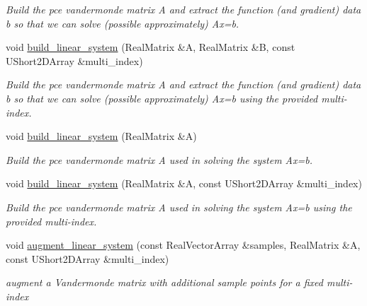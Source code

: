 \begin{DoxyCompactItemize}
\begin{DoxyCompactList}\small\item\em Build the pce vandermonde matrix A and extract the function (and gradient) data b so that we can solve (possible approximately) Ax=b. \end{DoxyCompactList}\item 
void \hyperlink{classPecos_1_1RegressOrthogPolyApproximation_a28018036bd652f9eaa722ab919317a23}{build\+\_\+linear\+\_\+system} (Real\+Matrix \&A, Real\+Matrix \&B, const U\+Short2\+D\+Array \&multi\+\_\+index)\label{classPecos_1_1RegressOrthogPolyApproximation_a28018036bd652f9eaa722ab919317a23}

\begin{DoxyCompactList}\small\item\em Build the pce vandermonde matrix A and extract the function (and gradient) data b so that we can solve (possible approximately) Ax=b using the provided multi-\/index. \end{DoxyCompactList}\item 
void \hyperlink{classPecos_1_1RegressOrthogPolyApproximation_a620d894eef826b544a8ddb15e10c3e19}{build\+\_\+linear\+\_\+system} (Real\+Matrix \&A)\label{classPecos_1_1RegressOrthogPolyApproximation_a620d894eef826b544a8ddb15e10c3e19}

\begin{DoxyCompactList}\small\item\em Build the pce vandermonde matrix A used in solving the system Ax=b. \end{DoxyCompactList}\item 
void \hyperlink{classPecos_1_1RegressOrthogPolyApproximation_a3596c36aef41fa9dfe102f9324bedc0e}{build\+\_\+linear\+\_\+system} (Real\+Matrix \&A, const U\+Short2\+D\+Array \&multi\+\_\+index)\label{classPecos_1_1RegressOrthogPolyApproximation_a3596c36aef41fa9dfe102f9324bedc0e}

\begin{DoxyCompactList}\small\item\em Build the pce vandermonde matrix A used in solving the system Ax=b using the provided multi-\/index. \end{DoxyCompactList}\item 
void \hyperlink{classPecos_1_1RegressOrthogPolyApproximation_a5ad922fb56aeaaa1ca613930eefd0040}{augment\+\_\+linear\+\_\+system} (const Real\+Vector\+Array \&samples, Real\+Matrix \&A, const U\+Short2\+D\+Array \&multi\+\_\+index)\label{classPecos_1_1RegressOrthogPolyApproximation_a5ad922fb56aeaaa1ca613930eefd0040}

\begin{DoxyCompactList}\small\item\em augment a Vandermonde matrix with additional sample points for a fixed multi-\/index \end{DoxyCompactList}\end{DoxyCompactItemize}

